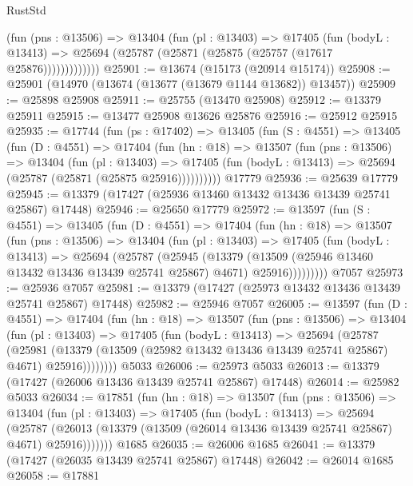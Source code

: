 \begin{lexlean}{RustStd}
\begin{coremodule}
              (fun (pns : @13506) =>
              @13404
                (fun (pl : @13403) =>
                @17405
                  (fun (bodyL : @13413) =>
                  @25694 (@25787 (@25871 (@25875 (@25757 (@17617 @25876)))))))))))))
@25901 := @13674 (@15173 (@20914 @15174))
@25908 := @25901 (@14970 (@13674 (@13677 (@13679 @1144 @13682)) @13457))
@25909 := @25898 @25908
@25911 := @25755 (@13470 @25908)
@25912 := @13379 @25911
@25915 := @13477 @25908 @13626 @25876
@25916 := @25912 @25915
@25935 := @17744
    (fun (ps : @17402) =>
    @13405
      (fun (S : @4551) =>
      @13405
        (fun (D : @4551) =>
        @17404
          (fun (hn : @18) =>
          @13507
            (fun (pns : @13506) =>
            @13404
              (fun (pl : @13403) =>
              @17405 (fun (bodyL : @13413) => @25694 (@25787 (@25871 (@25875 @25916))))))))))
    @17779
@25936 := @25639 @17779
@25945 := @13379 (@17427 (@25936 @13460 @13432 @13436 @13439 @25741 @25867) @17448)
@25946 := @25650 @17779
@25972 := @13597
    (fun (S : @4551) =>
    @13405
      (fun (D : @4551) =>
      @17404
        (fun (hn : @18) =>
        @13507
          (fun (pns : @13506) =>
          @13404
            (fun (pl : @13403) =>
            @17405
              (fun (bodyL : @13413) =>
              @25694
                (@25787
                  (@25945
                    (@13379
                      (@13509 (@25946 @13460 @13432 @13436 @13439 @25741 @25867) @4671)
                      @25916)))))))))
    @7057
@25973 := @25936 @7057
@25981 := @13379 (@17427 (@25973 @13432 @13436 @13439 @25741 @25867) @17448)
@25982 := @25946 @7057
@26005 := @13597
    (fun (D : @4551) =>
    @17404
      (fun (hn : @18) =>
      @13507
        (fun (pns : @13506) =>
        @13404
          (fun (pl : @13403) =>
          @17405
            (fun (bodyL : @13413) =>
            @25694
              (@25787
                (@25981
                  (@13379 (@13509 (@25982 @13432 @13436 @13439 @25741 @25867) @4671) @25916))))))))
    @5033
@26006 := @25973 @5033
@26013 := @13379 (@17427 (@26006 @13436 @13439 @25741 @25867) @17448)
@26014 := @25982 @5033
@26034 := @17851
    (fun (hn : @18) =>
    @13507
      (fun (pns : @13506) =>
      @13404
        (fun (pl : @13403) =>
        @17405
          (fun (bodyL : @13413) =>
          @25694
            (@25787
              (@26013 (@13379 (@13509 (@26014 @13436 @13439 @25741 @25867) @4671) @25916)))))))
    @1685
@26035 := @26006 @1685
@26041 := @13379 (@17427 (@26035 @13439 @25741 @25867) @17448)
@26042 := @26014 @1685
@26058 := @17881

\end{coremodule}
\end{lexlean}
